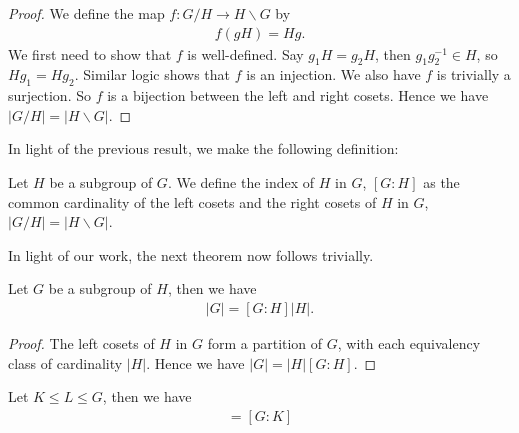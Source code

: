 \documentclass[]{article}
\begin{document}
\begin{proof}
	We define the map $f: G / H \to H \backslash G$	by
	\begin{align*}
			f(gH) = Hg.
	\end{align*}
	We first need to show that $f$ is well-defined. Say $g_1H = g_2H$, then $g_1g_2^{-1} \in H$, so $Hg_1 = Hg_2$. Similar logic shows that $f$ is an injection. We also have $f$ is trivially a surjection. So $f$ is a bijection between the left and right cosets. Hence we have $|G / H| = |H \backslash G|$.
\end{proof}

In light of the previous result, we make the following definition:

\begin{defi} 
		Let $H$ be a subgroup of $G$. We define the index of $H$ in $G$, $[G:H]$ as the common cardinality of the left cosets and the right cosets of $H$ in $G$, $|G / H| = |H \backslash G|$.
\end{defi}

In light of our work, the next theorem now follows trivially.

\begin{thm} 
	Let $G$ be a subgroup of $H$, then we have
	\begin{align*}
			|G| = [G:H]|H|.
	\end{align*}
\end{thm}

\begin{proof}
		The left cosets of $H$ in $G$ form a partition of $G$, with each equivalency class of cardinality $|H|$. Hence we have $|G| = |H|[G:H]$.
\end{proof}

\begin{thm}
	Let $K \leq L \leq G$, then we have 
	\begin{align*}
			[G:L][L:K] = [G:K]
	\end{align*}
\end{thm}
\end{document}
